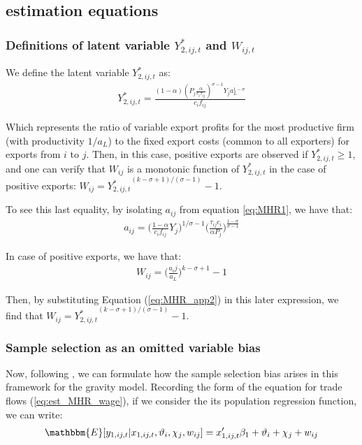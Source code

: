 \subsection{\cite{helpman2008estimating} estimation equations} \label{estimation_equations_derivation}

\subsubsection{Definitions of latent variable $Y_{2,ij,t}^*$ and $W_{ij,t}$}

We define the latent variable $Y_{2,ij,t}^*$ as:
\begin{align}
    Y_{2,ij,t}^*=\frac{(1-\alpha)\left(P_{j} \frac{\alpha}{c_{i} \tau_{i j}}\right)^{\sigma-1} Y_{j} a_{L}^{1-\sigma}}{c_{i} f_{i j}}
    \label{eq:MHR_app1}
\end{align}

Which represents the ratio of variable export profits for the most productive firm (with productivity $1/a_L$) to the fixed export costs (common to all exporters) for exports from $i$ to $j$. Then, in this case, positive exports are observed if $Y_{2,ij,t}^* \geq 1$, and one can verify that $W_{ij}$ is a monotonic function of $Y_{2,ij,t}^*$ in the case of positive exports: $W_{ij} = {Y_{2,ij,t}^*}^{(k-\sigma +1)/(\sigma-1)}-1$.

To see this last equality, by isolating $a_{ij}$ from equation \ref{eq:MHR1}, we have that:
\begin{align}
    a_{ij} = \Big( \frac{1-\alpha}{c_i f_{ij}} Y_j\Big)^{1/\sigma-1} \Big( \frac{\tau_{ij} c_i}{\alpha P_j}\Big)^{\frac{1 - \sigma}{\sigma-1}}
    \label{eq:MHR_app2}
\end{align}

In case of positive exports, we have that:
\begin{align}
    W_{ij} = \Big( \frac{a_ij}{a_L} \Big)^{k - \sigma +1} -1
\end{align}

Then, by substituting Equation (\ref{eq:MHR_app2}) in this later expression, we find that $W_{ij} = {Y_{2,ij,t}^*}^{(k-\sigma +1)/(\sigma-1)} -1$.

\subsubsection{Sample selection as an omitted variable bias}

Now, following \cite{heckman1979sample}, we can formulate how the sample selection bias arises in this framework for the gravity model. Recording the form of the equation for trade flows (\ref{eq:est_MHR_wage}), if we consider the its population regression function, we can write:
\begin{align}
\mathbbm{E} [y_{1,ij,t} \rvert x_{1,ij,t}, \vartheta_i, \chi_j,  w_{i j}]   = x_{1,ij,t}'\beta_1 + \vartheta_i + \chi_j +  w_{i j} 
\label{eq:heckman_app1}
\end{align}

